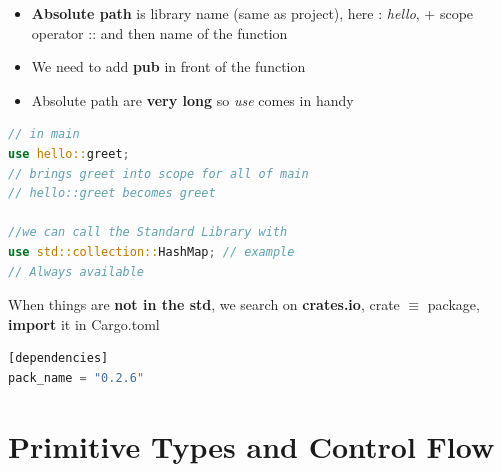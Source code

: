 \documentclass{report}
\begin{document}
\begin{multicols*}{2}
\begin{itemize}
  \item \textbf{Absolute path} is library name (same as project), here : \textit{hello}, + scope operator :: and then name of the function 
  \item We need to add \textbf{pub} in front of the function 
  \item Absolute path are \textbf{very long} so \textit{use} comes in handy
\end{itemize}

\begin{tcolorbox}[title=use,colback=backcolour,size=small,left=4mm]
\begin{lstlisting}[language=rust]
// in main
use hello::greet;
// brings greet into scope for all of main
// hello::greet becomes greet

//we can call the Standard Library with
use std::collection::HashMap; // example
// Always available
\end{lstlisting}
\end{tcolorbox}

When things are \textbf{not in the std}, we search on \textbf{crates.io}, crate $\equiv$ package,
\textbf{import} it in Cargo.toml

\begin{tcolorbox}[title=Cargo.toml,colback=backcolour,size=small,left=4mm]
\begin{lstlisting}[language=rust]
[dependencies]
pack_name = "0.2.6"
\end{lstlisting}
\end{tcolorbox}

\end{multicols*}

\chapter{Primitive Types and Control Flow}
\end{document}
